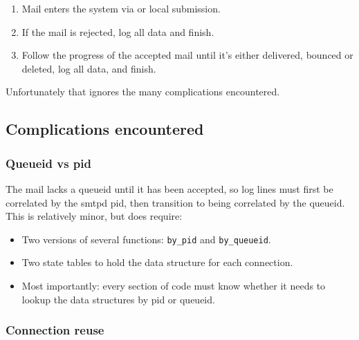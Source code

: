 \documentclass[a4paper,12pt,draft]{article}
\begin{document}
\begin{enumerate}

    \item Mail enters the system via \SMTP{} or local submission.

    \item If the mail is rejected, log all data and finish.

    \item Follow the progress of the accepted mail until it's either
        delivered, bounced or deleted, log all data, and finish.

\end{enumerate}

Unfortunately that ignores the many complications encountered.


\subsection{Complications encountered}

\label{complications}


\subsubsection{Queueid vs pid}

The mail lacks a queueid until it has been accepted, so log lines must
first be correlated by the smtpd pid, then transition to being correlated
by the queueid.  This is relatively minor, but does require:

\begin{itemize}

    \item Two versions of several functions: \texttt{by\_pid} and
        \texttt{by\_queueid}.

    \item Two state tables to hold the data structure for each connection.

    \item Most importantly: every section of code must know whether it
        needs to lookup the data structures by pid or queueid.

\end{itemize}

\subsubsection{Connection reuse}
\end{document}
